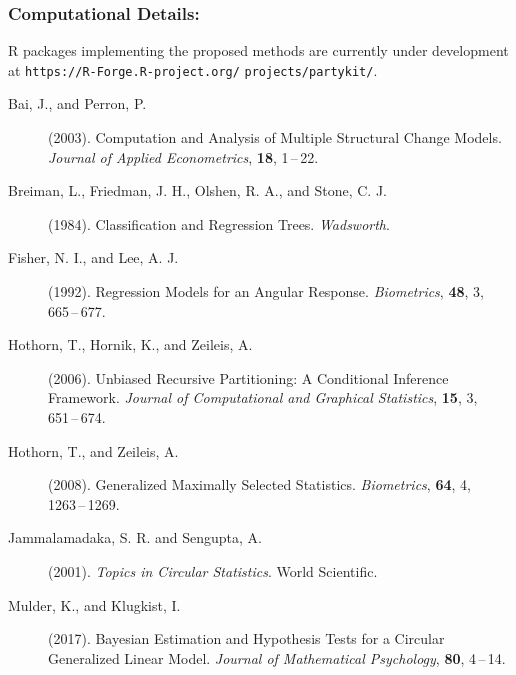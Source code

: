 \documentclass[twoside]{report}
\begin{document}
\subsubsection*{Computational Details:}
\textsf{R} packages implementing the proposed methods are currently under development at
\texttt{https://R-Forge.R-project.org/} \texttt{projects/partykit/}.



\bigskip

\begin{description}

\item[Bai, J., and Perron, P.] (2003).
     Computation and Analysis of Multiple Structural Change Models.
     {\it Journal of Applied Econometrics}, {\bf 18},
     1\,--\,22.     
     
\item[Breiman, L., Friedman, J. H., Olshen, R. A., and Stone, C. J.] (1984).
     Classification and Regression Trees.
     {\it Wadsworth}.

\item[Fisher, N. I., and Lee, A. J.] (1992).
     Regression Models for an Angular Response.
     {\it Biometrics}, {\bf 48}, 3,
     665\,--\,677.  

\item[Hothorn, T., Hornik, K., and Zeileis, A.] (2006).
     Unbiased Recursive Partitioning: A Conditional Inference Framework.
     {\it Journal of Computational and Graphical Statistics}, {\bf 15}, 3,
     651\,--\,674. 
     
\item[Hothorn, T., and Zeileis, A.] (2008).
     Generalized Maximally Selected Statistics.
     {\it Biometrics}, {\bf 64}, 4,
     1263\,--\,1269. 

\item[Jammalamadaka, S. R. and Sengupta, A.] (2001).
     {\it Topics in Circular Statistics}.
     World Scientific. 

\item[Mulder, K., and Klugkist, I.] (2017).
     Bayesian Estimation and Hypothesis Tests for a Circular Generalized Linear Model.
     {\it Journal of Mathematical Psychology}, {\bf 80},
     4\,--\,14. 



\end{description}
\end{document}
